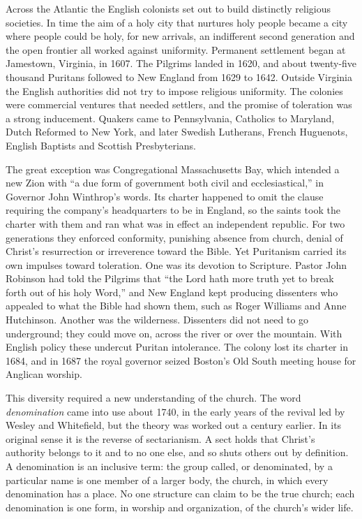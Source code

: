 Across the Atlantic the English colonists set out to build distinctly religious societies. In time
the aim of a holy city that nurtures holy people became a city where people could be holy, for new
arrivals, an indifferent second generation and the open frontier all worked against uniformity.
Permanent settlement began at Jamestown, Virginia, in 1607. The Pilgrims landed in 1620, and about twenty-five thousand Puritans followed to New England from 1629 to 1642. Outside Virginia the
English authorities did not try to impose religious uniformity. The colonies were commercial
ventures that needed settlers, and the promise of toleration was a strong inducement. Quakers came to
Pennsylvania, Catholics to Maryland, Dutch Reformed to New York, and later Swedish Lutherans, French
Huguenots, English Baptists and Scottish Presbyterians.

The great exception was Congregational Massachusetts Bay, which intended a new Zion with ``a due
form of government both civil and ecclesiastical,'' in Governor John Winthrop's words. Its charter
happened to omit the clause requiring the company's headquarters to be in England, so the saints
took the charter with them and ran what was in effect an independent republic. For two generations
they enforced conformity, punishing absence from church, denial of Christ's resurrection or
irreverence toward the Bible. Yet Puritanism carried its own impulses toward toleration. One was its
devotion to Scripture. Pastor John Robinson had told the Pilgrims that ``the Lord hath more truth yet
to break forth out of his holy Word,'' and New England kept producing dissenters who appealed to
what the Bible had shown them, such as Roger Williams and Anne Hutchinson. Another was the
wilderness. Dissenters did not need to go underground; they could move on, across the river or over
the mountain. With English policy these undercut Puritan intolerance. The colony lost its charter in
1684, and in 1687 the royal governor seized Boston's Old South meeting house for Anglican worship.

This diversity required a new understanding of the church. The word \emph{denomination} came into use
about 1740, in the early years of the revival led by Wesley and Whitefield, but the theory was worked
out a century earlier. In its original sense it is the reverse of sectarianism. A sect holds that Christ's authority belongs to it and to no one else, and so shuts others out by definition. A denomination is an inclusive
term: the group called, or denominated, by a particular name is one member of a larger body, the church, in which every denomination has a place. No one structure can claim to be the true church; each denomination is one form, in worship and organization, of the church's wider life.

